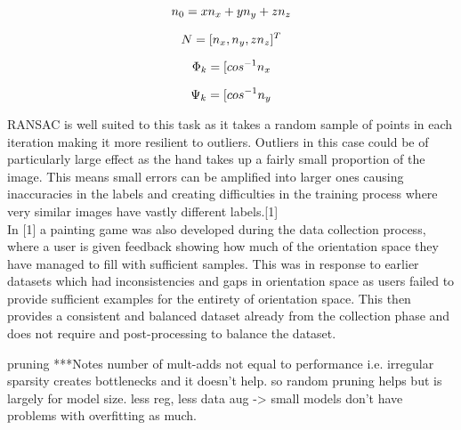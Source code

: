 \documentclass{article}
\begin{document}
\[\emph{$n_{0}$} =  \emph{$xn_{x}$} + \emph{$yn_{y}$} + \emph{$zn_{z}$}\]

\[\emph{$N$} =  [\emph{$n_{x}$}, \emph{$n_{y}$}, \emph{$zn_{z}$}]^T\]

\[\emph{$\Phi_{k}$} =  [\emph{$cos^{-1}n_{x}$}\]

\[\emph{$\Psi_{k}$} =  [\emph{$cos^{-1}n_{y}$}\]

RANSAC is well suited to this task as it takes a random sample of points in each iteration making it more resilient to outliers. Outliers in this case could be of particularly large effect as the hand takes up a fairly small proportion of the image. This means small errors can be amplified into larger ones causing inaccuracies in the labels and creating difficulties in the training process where very similar images have vastly different labels.[1]\\

In [1] a painting game was also developed during the data collection process, where a user is given feedback showing how much of the orientation space they have managed to fill with sufficient samples. This was in response to earlier datasets which had inconsistencies and gaps in orientation space as users failed to provide sufficient examples for the entirety of orientation space. This then provides a consistent and balanced dataset already from the collection phase and does not require and post-processing to balance the dataset.







 pruning
***Notes
number of mult-adds not equal to performance i.e. irregular sparsity creates bottlenecks and it doesn't help. so random pruning helps but is largely for model size. less reg, less data aug -> small models don't have problems with overfitting as much.
\end{document}
